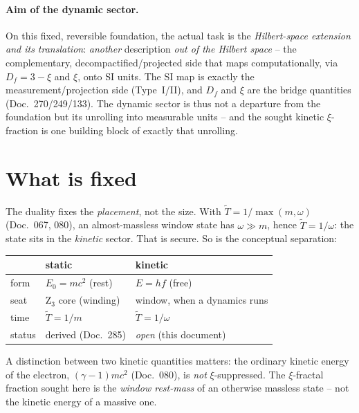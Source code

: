 \paragraph{Aim of the dynamic sector.} On this fixed, reversible foundation, the actual task is the
\emph{Hilbert-space extension and its translation}: \emph{another} description \emph{out of the Hilbert space} -- the complementary,
decompactified/projected side that maps computationally, via $D_f=3-\xi$ and $\xi$, onto SI units. The
SI map is exactly the measurement/projection side (Type~I/II), and $D_f$ and $\xi$ are the bridge
quantities (Doc.~270/249/133). The dynamic sector is thus not a departure from the foundation but its
unrolling into measurable units -- and the sought kinetic $\xi$-fraction is one building block of
exactly that unrolling.

\section{What is fixed}
The duality fixes the \emph{placement}, not the size. With $\tilde T=1/\max(m,\omega)$
(Doc.~067, 080), an almost-massless window state has $\omega\gg m$, hence $\tilde T=1/\omega$: the
state sits in the \emph{kinetic} sector. That is secure. So is the conceptual separation:
\begin{center}
\begin{tabular}{lll}
\toprule
 & static & kinetic \\
\midrule
form        & $E_0=mc^2$ (rest)            & $E=hf$ (free) \\
seat        & Z$_3$ core (winding)         & window, when a dynamics runs \\
time        & $\tilde T=1/m$               & $\tilde T=1/\omega$ \\
status      & derived (Doc.~285)           & \emph{open} (this document) \\
\bottomrule
\end{tabular}
\end{center}
A distinction between two kinetic quantities matters: the ordinary kinetic energy of the electron,
$(\gamma-1)mc^2$ (Doc.~080), is \emph{not} $\xi$-suppressed. The $\xi$-fractal fraction sought here
is the \emph{window rest-mass} of an otherwise massless state -- not the kinetic energy of a massive
one.

